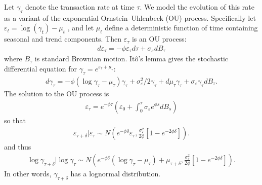 \documentclass{article}
\begin{document}
Let $\gamma_\tau$ denote the transaction rate at time $\tau$. We model the evolution of this rate as a variant of the exponential Ornstein–Uhlenbeck (OU) process. Specifically let $\varepsilon_t = \log(\gamma_t) - \mu_t$ , and let $\mu_t$ define a deterministic function of time containing seasonal and trend components. Then $\varepsilon_{\tau}$ is an OU process:
\begin{align*}
d\varepsilon_{\tau} = -\phi \varepsilon_{\tau}d\tau + \sigma_{\varepsilon} dB_{\tau}
\end{align*}
where $B_\tau$ is standard Brownian motion. It\^{o}'s lemma gives the stochastic differential equation for $\gamma_{\tau} = e^{\varepsilon_{\tau} + \mu_{\tau}}$:
\begin{align*}
d\gamma_\tau = -\phi(\log\gamma_\tau - \mu_\tau)\gamma_\tau + \sigma_{\varepsilon}^2/2\gamma_\tau +d\mu_\tau \gamma_\tau + \sigma_{\varepsilon}\gamma_\tau dB_\tau.
\end{align*}
The solution to the OU process is
\begin{align*}
\varepsilon_{\tau} = e^{-\phi\tau}\left(\varepsilon_0 + \int_0^\tau \sigma_{\varepsilon}e^{\phi s}dB_s\right)
\end{align*}
so that 
\begin{align*}
\varepsilon_{\tau + \delta} | \varepsilon_{\tau} \sim N\left(e^{-\phi\delta}\varepsilon_{\tau}, \frac{\sigma_{\varepsilon}^2}{2\phi}\left[1 - e^{-2\phi\delta}\right]\right).
\end{align*}
and thus
\begin{align*}
\log \gamma_{\tau + \delta}|\log\gamma_\tau \sim N\left(e^{-\phi\delta}(\log\gamma_{\tau} - \mu_\tau) + \mu_{\tau + \delta}, \frac{\sigma_{\varepsilon}^2}{2\phi}\left[1 - e^{-2\phi\delta}\right]\right).
\end{align*}
In other words, $\gamma_{\tau + \delta}$ has a lognormal distribution. 
\end{document}
